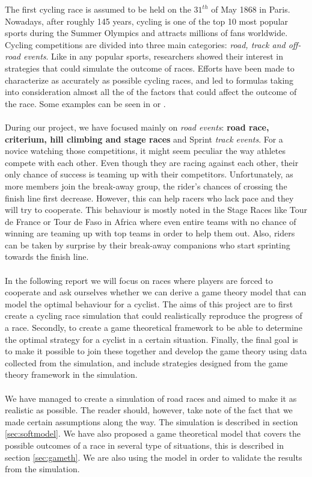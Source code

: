 \documentclass[10pt, a4paper]{report}
\begin{document}
The first cycling race is assumed to be held on the $31^{th}$ of May 1868 in Paris. Nowadays, after roughly 145 years, cycling is one of the top 10 most popular sports during the Summer Olympics \cite{TopEndSportsUrl} and attracts millions of fans worldwide. Cycling competitions are divided into three main categories: \textit{road, track and off-road events}. Like in any popular sports, researchers showed their interest in strategies that could simulate the outcome of races. Efforts have been made to characterize as accurately as possible cycling races, and led to formulas taking into consideration almost all the of the factors  that could affect the outcome of the race. Some examples can be seen in \cite{AgentModel} or \cite{SlipStream} .
\\\\
During our project, we have focused mainly on \textit{road events}: \textbf{road race, criterium, hill climbing and stage races} and Sprint \textit{track events}. For a novice watching those competitions, it might seem peculiar the way athletes compete with each other. Even though they are racing against each other, their only chance of success is teaming up with their competitors. Unfortunately, as more members join the break-away group, the rider's chances of crossing the finish line first decrease. However, this can help racers who lack pace and they will try to cooperate. This behaviour is mostly noted in the Stage Races like Tour de France or Tour de Faso in Africa where even entire teams with no chance of winning are teaming up with top teams in order to help them out. Also, riders can be taken by surprise by their break-away companions who start sprinting towards the finish line.
\\\\
In the following report we will focus on races where players are forced to cooperate and ask ourselves whether we can derive a game theory model that can model the optimal behaviour for a cyclist. The aims of this project are to first create a cycling race simulation that could realistically reproduce the progress of a race. Secondly, to create a game theoretical framework to be able to determine the optimal strategy for a cyclist in a certain situation. Finally, the final goal is to make it possible to join these together and develop the game theory using data collected from the simulation, and include strategies designed from the game theory framework in the simulation.
\\\\
We have managed to create a simulation of road races and aimed to make it as realistic as possible. The reader should, however, take note of the fact that we made certain assumptions along the way. The simulation is described in section \ref{sec:softmodel}. We have also proposed a game theoretical model that  covers the possible outcomes of a race in several type of situations, this is described in section \ref{sec:gameth}. We are also using the model in order to validate the results from the simulation.
\end{document}
